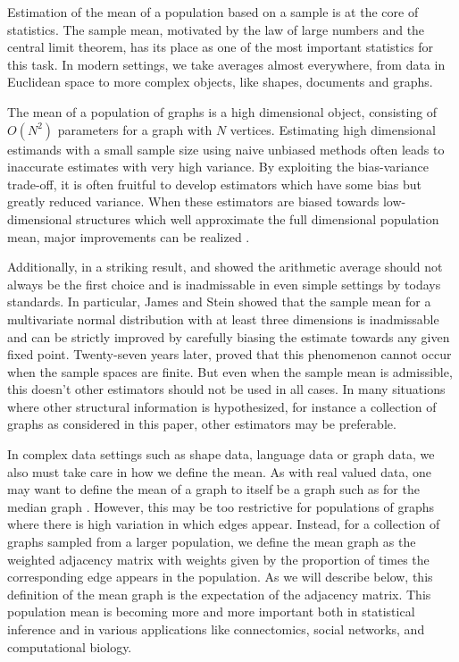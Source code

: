 \documentclass[10pt,letterpaper]{article}
\begin{document}
Estimation of the mean of a population based on a sample is at the core of statistics.
The sample mean, motivated by the law of large numbers and the central limit theorem, has its place as one of the most important statistics for this task.
In modern settings, we take averages almost everywhere, from data in Euclidean space to more complex objects, like shapes, documents and graphs.

The mean of a population of graphs is a high dimensional object, consisting of $O(N^2)$ parameters for a graph with $N$ vertices.
Estimating high dimensional estimands with a small sample size using naive unbiased methods often leads to inaccurate estimates with very high variance.
By exploiting the bias-variance trade-off, it is often fruitful to develop estimators which have some bias but greatly reduced variance.
When these estimators are biased towards low-dimensional structures which well approximate the full dimensional population mean, major improvements can be realized \citep{trunk1979problem}.


Additionally, in a striking result, \citet{stein1956inadmissibility} and \citet{james1961estimation} showed the arithmetic average should not always be the first choice and is inadmissable in even simple settings by todays standards. 
In particular, James and Stein showed that the sample mean for a multivariate normal distribution with at least three dimensions is inadmissable and can be strictly improved by carefully biasing the  estimate towards any given fixed point. 
Twenty-seven years later, \citet{gutmann1982stein} proved that this phenomenon cannot occur when the sample spaces are finite.
But even when  the sample mean is admissible, this doesn't other estimators should not be used in all cases.
In many situations where other structural information is hypothesized, for instance a collection of graphs as considered in this paper, other estimators may be preferable.

In complex data settings such as shape data, language data or graph data, we also must take care in how we define the mean.
As with real valued data, one may want to define the mean of a graph to itself be a graph such as for the median graph \citep{jiang2001median}.
However, this may be too restrictive for populations of graphs where there is high variation in which edges appear. 
Instead, for a collection of graphs sampled from a larger population, we define the mean graph as the weighted adjacency matrix with weights given by the proportion of times the corresponding edge appears in the population. 
As we will describe below, this definition of the mean graph is the expectation of the adjacency matrix.
This population mean is becoming more and more important both in statistical inference and in various applications like connectomics, social networks, and computational biology.
\end{document}
